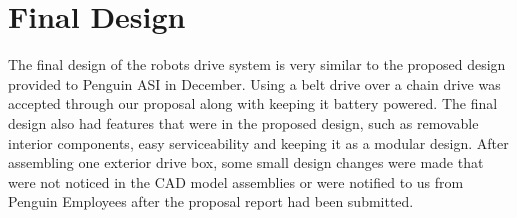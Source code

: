 \section{Final Design}
The final design of the robots drive system is very similar to the proposed design provided to Penguin ASI in December. Using a belt drive over a chain drive was accepted through our proposal along with keeping it battery powered. The final design also had features that were in the proposed design, such as removable interior components, easy serviceability and keeping it as a modular design. After assembling one exterior drive box, some small design changes were made that were not noticed in the CAD model assemblies or were notified to us from Penguin Employees after the proposal report had been submitted. 